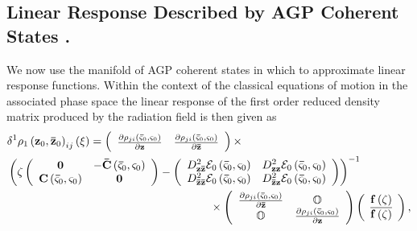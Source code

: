 \documentclass[aps,preprint]{revtex4}%
\begin{document}
\subsection{Linear Response Described by AGP Coherent States .}

We now use the manifold of AGP coherent states in which to approximate linear
response functions. Within the context of the classical equations of motion in
the associated phase space the linear response of the first order reduced
density matrix produced by the radiation field is then given as
\begin{align}
&  \delta^{1}\rho_{1}\left(  \mathbf{z}{_{0},\mathbf{\bar{z}}_{0}}\right)
_{ij}\left(  \xi\right)  =\left(
\begin{array}
[c]{cc}%
\frac{\partial\rho_{ji}\left(  \mathbf{\bar{\varsigma}}_{0},\mathbf{\varsigma
}_{0}\right)  }{\partial\mathbf{z}} & \frac{\partial\rho_{ji}\left(
\mathbf{\bar{\varsigma}}_{0},\mathbf{\varsigma}_{0}\right)  }{\partial
\mathbf{\bar{z}}}%
\end{array}
\right)  \times\nonumber\\
&  \left(  \zeta\left(
\begin{array}
[c]{cc}%
\mathbf{0} & -\mathbf{\bar{C}}\left(  \mathbf{\bar{\varsigma}}_{0}%
,\mathbf{\varsigma}_{0}\right) \\
\mathbf{C}\left(  \mathbf{\bar{\varsigma}}_{0},\mathbf{\varsigma}_{0}\right)
& \mathbf{0}%
\end{array}
\right)  -\left(
\begin{array}
[c]{cc}%
D_{\mathbf{z\bar{z}}}^{2}\mathcal{E}_{0}\left(  \mathbf{\bar{\varsigma}}%
_{0},\mathbf{\varsigma}_{0}\right)  & D_{\mathbf{zz}}^{2}\mathcal{E}%
_{0}\left(  \mathbf{\bar{\varsigma}}_{0},\mathbf{\varsigma}_{0}\right) \\
D_{\mathbf{\bar{z}\bar{z}}}^{2}\mathcal{E}_{0}\left(  \mathbf{\bar{\varsigma}%
}_{0},\mathbf{\varsigma}_{0}\right)  & D_{\mathbf{\bar{z}z}}^{2}%
\mathcal{E}_{0}\left(  \mathbf{\bar{\varsigma}}_{0},\mathbf{\varsigma}%
_{0}\right)
\end{array}
\right)  \right)  ^{-1}\nonumber\\
&  \quad\quad\quad\quad\quad\quad\quad\quad\quad\quad\quad\quad\quad\quad
\quad\quad\quad\quad\times\left(
\begin{array}
[c]{cc}%
\frac{\partial\rho_{ji}\left(  \mathbf{\bar{\varsigma}}_{0},\mathbf{\varsigma
}_{0}\right)  }{\partial\mathbf{\bar{z}}} & \mathbb{O}\\
\mathbb{O} & \frac{\partial\rho_{ji}\left(  \mathbf{\bar{\varsigma}}%
_{0},\mathbf{\varsigma}_{0}\right)  }{\partial\mathbf{z}}%
\end{array}
\right)  \left(
\begin{array}
[c]{c}%
\mathbf{f}\left(  \zeta\right) \\
\overline{\mathbf{f}\left(  \zeta\right)  }%
\end{array}
\right)  ,
\end{align}
\end{document}
